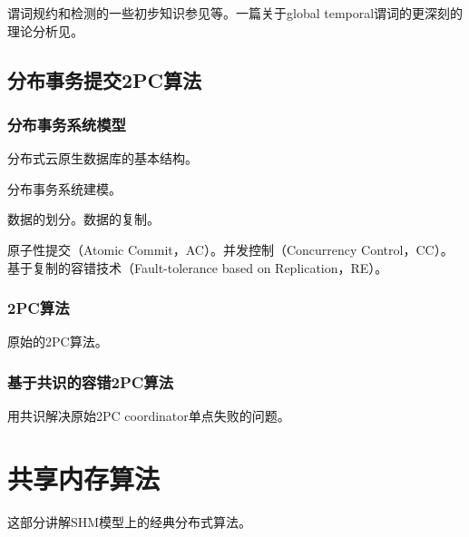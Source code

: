 \documentclass[UTF8]{ctexrep}
\begin{document}
谓词规约和检测的一些初步知识参见\cite{Chandy85, Cooper91, Babaoglu95}等。一篇关于global temporal谓词的更深刻的理论分析见\cite{Charron95}。



\chapter{分布事务提交2PC算法} \label{Chap_2PC}

\section{分布事务系统模型}

分布式云原生数据库的基本结构。

分布事务系统建模。

数据的划分。数据的复制。

原子性提交（Atomic Commit，AC）。并发控制（Concurrency Control，CC）。基于复制的容错技术（Fault-tolerance based on Replication，RE）。


\section{2PC算法}

原始的2PC算法。

\section{基于共识的容错2PC算法}

用共识解决原始2PC coordinator单点失败的问题。

\part{共享内存算法}

这部分讲解SHM模型上的经典分布式算法。

\end{document}
